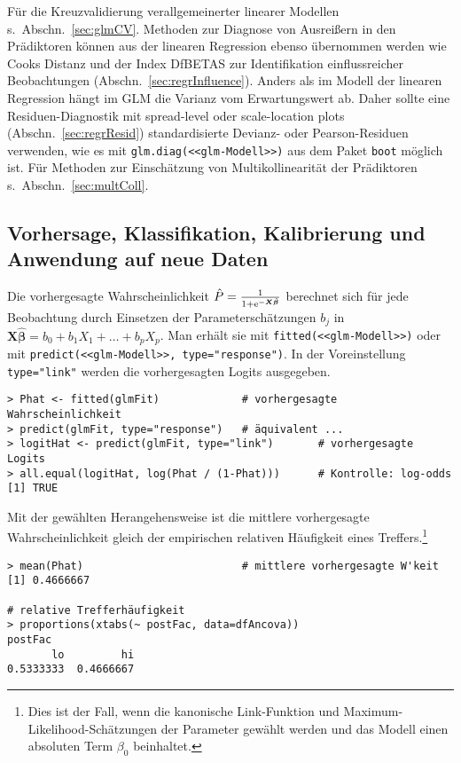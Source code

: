 Für die Kreuzvalidierung verallgemeinerter linearer Modellen s.\ Abschn.\ \ref{sec:glmCV}. Methoden zur Diagnose von Ausreißern in den Prädiktoren können aus der linearen Regression ebenso übernommen werden wie Cooks Distanz und der Index DfBETAS zur Identifikation einflussreicher Beobachtungen (Abschn.\ \ref{sec:regrInfluence}). Anders als im Modell der linearen Regression hängt im GLM die Varianz vom Erwartungswert ab. Daher sollte eine Residuen-Diagnostik mit spread-level oder scale-location plots (Abschn.\ \ref{sec:regrResid}) standardisierte Devianz- oder Pearson-Residuen verwenden, wie es mit \lstinline!glm.diag(<<glm-Modell>>)! aus dem Paket  \lstinline!boot!  möglich ist. Für Methoden zur Einschätzung von Multikollinearität der Prädiktoren s.\ Abschn.\ \ref{sec:multColl}.

\subsection{Vorhersage, Klassifikation, Kalibrierung und Anwendung auf neue Daten}
\label{sec:logisticPred}

Die vorhergesagte Wahrscheinlichkeit $\hat{P} = \frac{1}{1+{\mathrm{e}}^{- \bm{X} \hat{\bm{\beta}}}}$ berechnet sich für jede Beobachtung durch Einsetzen der Parameterschätzungen $b_{j}$ in $\bm{X} \hat{\bm{\beta}} = b_{0} + b_{1} X_{1} + \dots + b_{p} X_{p}$. Man erhält sie mit \lstinline!fitted(<<glm-Modell>>)! oder mit \lstinline!predict(<<glm-Modell>>, type="response")!. In der Voreinstellung \lstinline!type="link"! werden die vorhergesagten Logits ausgegeben.
\begin{lstlisting}
> Phat <- fitted(glmFit)             # vorhergesagte Wahrscheinlichkeit
> predict(glmFit, type="response")   # äquivalent ...
> logitHat <- predict(glmFit, type="link")       # vorhergesagte Logits
> all.equal(logitHat, log(Phat / (1-Phat)))      # Kontrolle: log-odds
[1] TRUE
\end{lstlisting}

Mit der gewählten Herangehensweise ist die mittlere vorhergesagte Wahrscheinlichkeit gleich der empirischen relativen Häufigkeit eines Treffers.\footnote{Dies ist der Fall, wenn die kanonische Link-Funktion und Maximum-Likelihood-Schätzungen der Parameter gewählt werden und das Modell einen absoluten Term $\beta_{0}$ beinhaltet.}
\begin{lstlisting}
> mean(Phat)                         # mittlere vorhergesagte W'keit
[1] 0.4666667

# relative Trefferhäufigkeit
> proportions(xtabs(~ postFac, data=dfAncova))
postFac
       lo         hi
0.5333333  0.4666667
\end{lstlisting}

